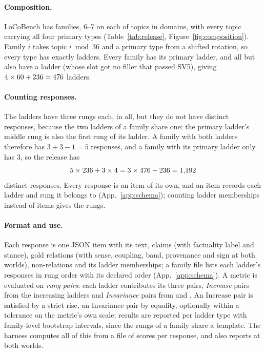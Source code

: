 \documentclass[11pt]{article}
\begin{document}
\paragraph{Composition.} LoCoBench has \lbFamilies{} families, 6--7 on each of \lbTopics{}
topics in \lbDomains{} domains, with every topic carrying all four primary types
(Table~\ref{tab:release}, Figure~\ref{fig:composition}). Family $i$ takes topic $i \bmod 36$ and a
primary type from a shifted rotation, so every type has exactly \lbNConflict{} ladders. Every
family has its primary ladder, and all but \lbMissingControl{} also have a  ladder
(whose  slot got no filler that passed SV5), giving $4\times60+236=476$
ladders.

\paragraph{Counting responses.} The \lbLadders{} ladders have three rungs each, \lbRungSlots{} in
all, but they do not have \lbRungSlots{} distinct responses, because the two ladders of a family
share one: the primary ladder's middle rung is also the first rung of its  ladder. A
family with both ladders therefore has $3+3-1=5$ responses, and a family with its primary ladder
only has $3$, so the release has
\[
  5\times236 + 3\times4
  = 3\times476 - 236 = 1{,}192
\]
distinct responses. Every response is an item of its own, and an item records each ladder and rung
it belongs to (App.~\ref{app:schema}); counting ladder memberships instead of items gives the
\lbRungSlots{} rungs.

\paragraph{Format and use.} Each response is one JSON item with its text, claims (with factuality
label and stance), gold relations (with sense, coupling, band, provenance and sign at both
worlds), non-relations and its ladder memberships; a family file lists each ladder's responses in
rung order with its declared order (App.~\ref{app:schema}). A metric is evaluated on \emph{rung
pairs}: each ladder contributes its three pairs, \sThreeNIncPairs{} \emph{Increase} pairs from the
increasing ladders and \sThreeNInvPairs{} \emph{Invariance} pairs from  and
. An Increase pair is satisfied by a strict rise, an Invariance pair by equality,
optionally within a tolerance on the metric's own scale; results are reported per ladder type with
family-level bootstrap intervals, since the rungs of a family share a template. The harness
computes all of this from a file of scores per response, and also reports  at both
worlds.
\end{document}
